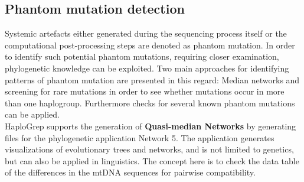 \subsection{Phantom mutation detection}
\label{hg:phantom}
Systemic artefacts either generated during the sequencing process itself or the computational post-processing steps are denoted as phantom mutation. In order to identify such potential phantom mutations, requiring closer examination, phylogenetic knowledge can be exploited. Two main approaches for identifying patterns of phantom mutation are presented in this regard: Median networks and screening for rare mutations in order to see whether mutations occur in more than one haplogroup. Furthermore checks for several known phantom mutations can be applied. \\
HaploGrep supports the generation of \textbf{Quasi-median Networks} by generating files for the phylogenetic application Network 5. The application generates visualizations of evolutionary trees and networks, and is not limited to genetics, but can also be applied in linguistics. The concept here is to check the data table of the differences in the mtDNA sequences for pairwise compatibility. \\

